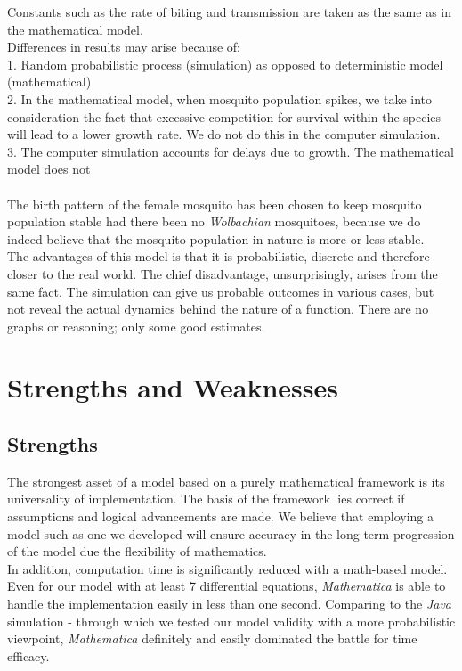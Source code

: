 \documentclass{article}
\begin{document}
Constants such as the rate of biting and transmission are taken as the same as in the mathematical model.\\

Differences in results may arise because of:\\
1. Random probabilistic process (simulation) as opposed to deterministic model (mathematical)\\
2. In the mathematical model, when mosquito population spikes, we take into consideration the fact that excessive competition for survival within the species will lead to a lower growth rate. We do not do this in the computer simulation.\\
3. The computer simulation accounts for delays due to growth. The mathematical model does not\\\\
The birth pattern of the female mosquito has been chosen to keep mosquito population stable had there been no \textit{Wolbachian} mosquitoes, because we do indeed believe that the mosquito population in nature is more or less stable.\\

The advantages of this model is that it is probabilistic, discrete and therefore closer to the real world. The chief disadvantage, unsurprisingly, arises from the same fact. The simulation can give us probable outcomes in various cases, but not reveal the actual dynamics behind the nature of a function. There are no graphs or reasoning; only some good estimates.\\

\section{Strengths and Weaknesses}
\subsection{Strengths}
The strongest asset of a model based on a purely mathematical framework is its universality of implementation. The basis of the framework lies correct if assumptions and logical advancements are made. We believe that employing a model such as one we developed will ensure accuracy in the long-term progression of the model due the flexibility of mathematics.\\

In addition, computation time is significantly reduced with a math-based model. Even for our model with at least 7 differential equations, \textit{Mathematica} is able to handle the implementation easily in less than one second. Comparing to the \textit{Java} simulation - through which we tested our model validity with a more probabilistic viewpoint, \textit{Mathematica} definitely and easily dominated the battle for time efficacy.\\
\end{document}
